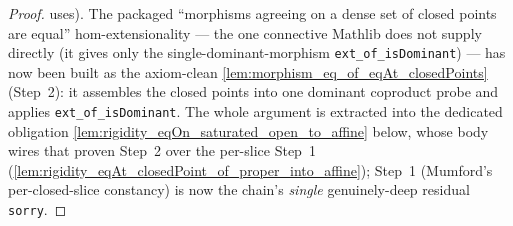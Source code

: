 \begin{proof}
  uses). The packaged ``morphisms agreeing on a dense set of closed points are equal''
  hom-extensionality --- the one connective Mathlib does not supply directly (it gives only the
  single-dominant-morphism \texttt{ext\_of\_isDominant}) --- has now been built as the axiom-clean
  \cref{lem:morphism_eq_of_eqAt_closedPoints} (Step~2): it assembles the closed points into one
  dominant coproduct probe and applies \texttt{ext\_of\_isDominant}. The whole argument is extracted
  into the dedicated obligation \cref{lem:rigidity_eqOn_saturated_open_to_affine} below, whose body
  wires that proven Step~2 over the per-slice Step~1
  (\cref{lem:rigidity_eqAt_closedPoint_of_proper_into_affine}); Step~1 (Mumford's per-closed-slice
  constancy) is now the chain's \emph{single} genuinely-deep residual \texttt{sorry}.
\end{proof}
